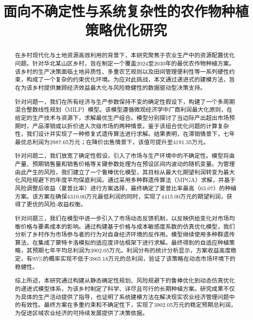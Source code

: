 \documentclass[withoutpreface,bwprint]{cumcmthesis} %
\title{面向不确定性与系统复杂性的农作物种植策略优化研究}
\begin{document}
\maketitle
\begin{abstract}
在乡村现代化与土地资源高效利用的背景下，本研究聚焦于农业生产中的资源配置优化问题。针对华北某山区乡村，旨在制定一个覆盖2024至2030年的最优农作物种植方案。该乡村的生产决策面临土地异质性、多重农艺规则以及田间管理便利性等一系列硬性约束，构成了一个复杂的约束优化环境。为应对此挑战，本文通过递进式的建模方法，旨在为该乡村提供兼顾经济效益最大化与风险稳健性的数据驱动型决策支持。

针对问题一，我们在所有经济与生产参数保持不变的确定性假设下，构建了一个多周期混合整数线性规划（MILP）模型。该模型遵循微观经济学中厂商利润最大化原则，在给定的生产技术与资源下，求解最优生产组合。模型分别探讨了当边际产出超出市场预期时，产品滞销或以折价进入次级市场的两种情景。鉴于该组合优化问题的计算复杂性，我们设计并实现了一种修复式遗传算法进行求解。结果表明，在滞销情景下，七年最优总利润为2987.65万元；在降价出售情景下，该值可提升至4191.35万元。

针对问题二，我们放宽了确定性假设，引入了市场与生产环境中的不确定性。模型将亩产量、预期销售量和销售价格等关键参数处理为在预设区间内波动的随机变量。为管理由此产生的风险，我们建立了一个鲁棒优化模型，其目标从最大化期望利润转变为最大化风险规避下的年度平均保底利润。通过采用多种群遗传算法（MPGA）求解，并基于风险调整后收益（夏普比率）进行方案选择，最终确定了夏普比率最高（63.07）的种植方案。该方案在确保4310.00万元最低利润的同时，实现了4415.00万元的期望利润，获得了更优的风险-收益权衡。

针对问题三，我们在模型中进一步引入了市场动态反馈机制，以反映供给变化对市场均衡价格与要素成本的影响。通过构建基于价格与成本敏感度系数的仿真优化模型，我们分析了乡村作为市场参与者的行为对自身经济环境的反作用。模型继续使用多种群遗传算法，在集成了蒙特卡洛模拟的适应度评估框架下进行求解。最终得到的自适应种植策略，其预期七年平均总利润为3902.05万元。利润分布的统计分析显示，方案收益高度稳定，有95\%的概率实现不低于3865.18万元的总利润，验证了该策略在动态市场环境下的稳健性。

综上所述，本研究通过构建从静态确定性规划、风险规避下的鲁棒优化到动态仿真优化的递进式模型体系，为该乡村制定了科学、详尽且可行的长期种植方案。研究成果不仅为具体的生产活动提供了指导，也证明了系统建模方法在解决现实农业经济管理问题中的有效性。最终方案在多重约束和不确定性下，实现了3902.05万元的稳定预期总利润，为促进区域农业经济的可持续发展提供了决策依据。



\end{abstract}





















\newpage



\newpage
\end{document}
